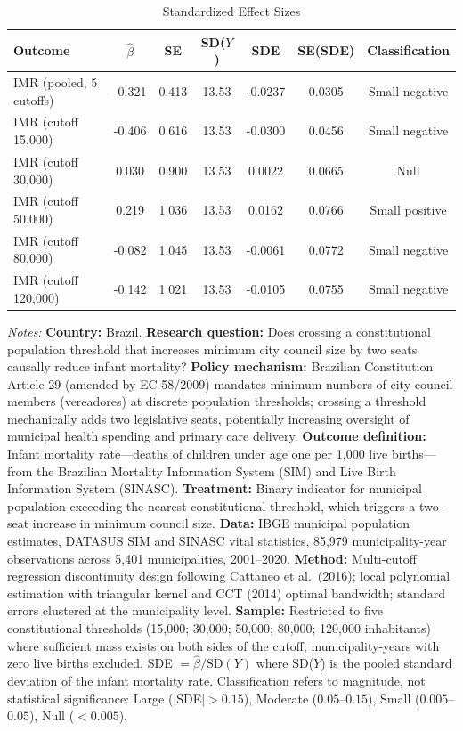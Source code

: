 \begin{table}[htbp]
\centering
\caption{Standardized Effect Sizes}
\label{tab:sde}
\begin{tabular}{lcccccc}
\toprule
Outcome & $\hat{\beta}$ & SE & SD($Y$) & SDE & SE(SDE) & Classification \\
\midrule
IMR (pooled, 5 cutoffs) & -0.321 & 0.413 & 13.53 & -0.0237 & 0.0305 & Small negative \\
IMR (cutoff 15,000) & -0.406 & 0.616 & 13.53 & -0.0300 & 0.0456 & Small negative \\
IMR (cutoff 30,000) & 0.030 & 0.900 & 13.53 & 0.0022 & 0.0665 & Null \\
IMR (cutoff 50,000) & 0.219 & 1.036 & 13.53 & 0.0162 & 0.0766 & Small positive \\
IMR (cutoff 80,000) & -0.082 & 1.045 & 13.53 & -0.0061 & 0.0772 & Small negative \\
IMR (cutoff 120,000) & -0.142 & 1.021 & 13.53 & -0.0105 & 0.0755 & Small negative \\
\bottomrule
\end{tabular}
\begin{tablenotes}[flushleft]\small
\item \textit{Notes:} \textbf{Country:} Brazil. \textbf{Research question:} Does crossing a constitutional population threshold that increases minimum city council size by two seats causally reduce infant mortality? \textbf{Policy mechanism:} Brazilian Constitution Article 29 (amended by EC 58/2009) mandates minimum numbers of city council members (vereadores) at discrete population thresholds; crossing a threshold mechanically adds two legislative seats, potentially increasing oversight of municipal health spending and primary care delivery. \textbf{Outcome definition:} Infant mortality rate---deaths of children under age one per 1,000 live births---from the Brazilian Mortality Information System (SIM) and Live Birth Information System (SINASC). \textbf{Treatment:} Binary indicator for municipal population exceeding the nearest constitutional threshold, which triggers a two-seat increase in minimum council size. \textbf{Data:} IBGE municipal population estimates, DATASUS SIM and SINASC vital statistics, 85,979 municipality-year observations across 5,401 municipalities, 2001--2020. \textbf{Method:} Multi-cutoff regression discontinuity design following Cattaneo et al.\ (2016); local polynomial estimation with triangular kernel and CCT (2014) optimal bandwidth; standard errors clustered at the municipality level. \textbf{Sample:} Restricted to five constitutional thresholds (15,000; 30,000; 50,000; 80,000; 120,000 inhabitants) where sufficient mass exists on both sides of the cutoff; municipality-years with zero live births excluded. SDE $= \hat{\beta} / \text{SD}(Y)$ where SD($Y$) is the pooled standard deviation of the infant mortality rate. Classification refers to magnitude, not statistical significance: Large ($|$SDE$| > 0.15$), Moderate ($0.05$--$0.15$), Small ($0.005$--$0.05$), Null ($< 0.005$).
\end{tablenotes}
\end{table}


